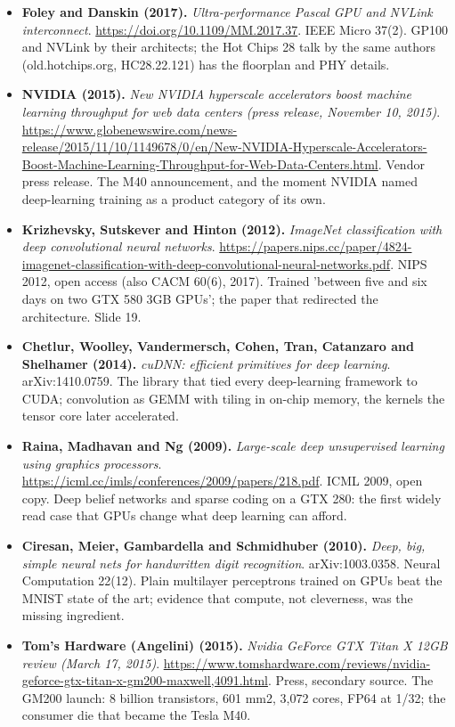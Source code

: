 \begin{itemize}[leftmargin=1.2em,itemsep=3pt]
\item \textbf{Foley and Danskin (2017).} \textit{Ultra-performance Pascal GPU and NVLink interconnect}. \url{https://doi.org/10.1109/MM.2017.37}. IEEE Micro 37(2). GP100 and NVLink by their architects; the Hot Chips 28 talk by the same authors (old.hotchips.org, HC28.22.121) has the floorplan and PHY details.
\item \textbf{NVIDIA (2015).} \textit{New NVIDIA hyperscale accelerators boost machine learning throughput for web data centers (press release, November 10, 2015)}. \url{https://www.globenewswire.com/news-release/2015/11/10/1149678/0/en/New-NVIDIA-Hyperscale-Accelerators-Boost-Machine-Learning-Throughput-for-Web-Data-Centers.html}. Vendor press release. The M40 announcement, and the moment NVIDIA named deep-learning training as a product category of its own.
\item \textbf{Krizhevsky, Sutskever and Hinton (2012).} \textit{ImageNet classification with deep convolutional neural networks}. \url{https://papers.nips.cc/paper/4824-imagenet-classification-with-deep-convolutional-neural-networks.pdf}. NIPS 2012, open access (also CACM 60(6), 2017). Trained 'between five and six days on two GTX 580 3GB GPUs'; the paper that redirected the architecture. Slide 19.
\item \textbf{Chetlur, Woolley, Vandermersch, Cohen, Tran, Catanzaro and Shelhamer (2014).} \textit{cuDNN: efficient primitives for deep learning}. arXiv:1410.0759. The library that tied every deep-learning framework to CUDA; convolution as GEMM with tiling in on-chip memory, the kernels the tensor core later accelerated.
\item \textbf{Raina, Madhavan and Ng (2009).} \textit{Large-scale deep unsupervised learning using graphics processors}. \url{https://icml.cc/imls/conferences/2009/papers/218.pdf}. ICML 2009, open copy. Deep belief networks and sparse coding on a GTX 280: the first widely read case that GPUs change what deep learning can afford.
\item \textbf{Ciresan, Meier, Gambardella and Schmidhuber (2010).} \textit{Deep, big, simple neural nets for handwritten digit recognition}. arXiv:1003.0358. Neural Computation 22(12). Plain multilayer perceptrons trained on GPUs beat the MNIST state of the art; evidence that compute, not cleverness, was the missing ingredient.
\item \textbf{Tom's Hardware (Angelini) (2015).} \textit{Nvidia GeForce GTX Titan X 12GB review (March 17, 2015)}. \url{https://www.tomshardware.com/reviews/nvidia-geforce-gtx-titan-x-gm200-maxwell,4091.html}. Press, secondary source. The GM200 launch: 8 billion transistors, 601 mm2, 3,072 cores, FP64 at 1/32; the consumer die that became the Tesla M40.
\end{itemize}
